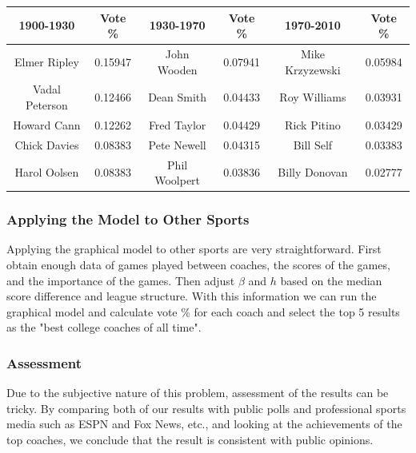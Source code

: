 \documentclass[11pt,notitlepage]{article}
\begin{document}
\begin{center}

\begin{tabular}{ | c | c | c| c | c| c| }

\hline

1900-1930  & Vote \% & 1930-1970  & Vote \% & 1970-2010  & Vote \% \\\hline

Elmer Ripley & 0.15947 & John Wooden & 0.07941 & Mike Krzyzewski & 0.05984 \\\hline

Vadal Peterson & 0.12466 & Dean Smith & 0.04433 & Roy Williams & 0.03931\\\hline

Howard Cann  &0.12262 & Fred Taylor & 0.04429 & Rick Pitino & 0.03429\\\hline

Chick Davies & 0.08383 & Pete Newell & 0.04315 & Bill Self & 0.03383 \\\hline

Harol Oolsen & 0.08383 & Phil Woolpert & 0.03836 & Billy Donovan & 0.02777\\

\hline

\end{tabular}

\end{center}

\subsubsection*{Applying the Model to Other Sports}

Applying the graphical model to other sports are very straightforward. First obtain enough data of games played between coaches, the scores of the games, and the importance of the games. Then adjust $\beta$ and $h$ based on the median score difference and league structure. With this information we can run the graphical model and calculate vote \% for each coach and select the top 5 results as the "best college coaches of all time".

\subsubsection*{Assessment}

\noindent Due to the subjective nature of this problem, assessment of the results can be tricky. By comparing both of our results with public polls and professional sports media such as ESPN and Fox News, etc., and looking at the achievements of the top coaches, we conclude that the result is consistent with public opinions.
\end{document}
